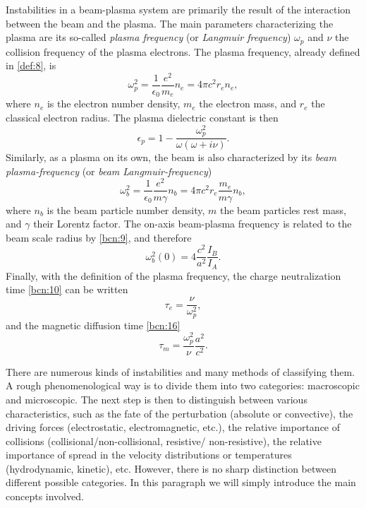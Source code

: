 \documentclass [12pt,a4paper,     ]{report} %
\begin{document}
	Instabilities in a beam-plasma system are primarily the result of the interaction between the beam and the plasma.  The main parameters characterizing the plasma are its so-called \emph{plasma frequency} (or \emph{Langmuir frequency})  $\omega_p$  and $\nu$ the collision frequency of the plasma electrons.  The plasma frequency, already defined in \eqref{def:8}, is
%
\begin{equation}\label{sta:5} %
         \omega_p^2 = \frac{1}{\epsilon_0} \frac{e^2}{m_e}  n_e
                    = 4 \pi c^2 r_e n_e,
\end{equation}
%
where $n_e$ is the electron number density, $m_e$ the electron mass, and $r_e$ the classical electron radius.  The plasma dielectric constant is then
%
\begin{equation}\label{sta:6} %
              \epsilon_p = 1 - \frac{\omega_p^2}{\omega(\omega+i\nu)}.
\end{equation}
%
Similarly, as a plasma on its own, the beam is also characterized by its \emph{beam plasma-frequency} (or \emph{beam Langmuir-frequency})
%
\begin{equation}\label{sta:7} %
        \omega_b^2 = \frac{1}{\epsilon_0} \frac{e^2}{m\gamma}  n_b
                   = 4 \pi c^2 r_e \frac{m_e}{m\gamma} n_b,
\end{equation}
%
where $n_b$ is the beam particle number density, $m$ the beam particles rest mass, and $\gamma$ their Lorentz factor.  The on-axis beam-plasma frequency is related to the beam scale radius by \eqref{bcn:9}, and therefore
%
\begin{equation}\label{sta:8} %
       \omega_b^2(0) = 4 \frac{c^2}{a^2} \frac{I_B}{I_A}.
\end{equation}
%
Finally, with the definition of the plasma frequency, the charge neutralization time \eqref{bcn:10} can be written
%
\begin{equation}\label{sta:10} %
    \tau_e =   \frac{\nu}{\omega_p^2},
\end{equation}
%
and the magnetic diffusion time \eqref{bcn:16}
%
\begin{equation}\label{sta:9} %
    \tau_m = \frac{\omega_p^2}{\nu} \frac{a^2}{c^2}.
\end{equation}
%

	There are numerous kinds of instabilities and many methods of classifying them.  A rough phenomenological way is to divide them into two categories: macroscopic and microscopic.  The next step is then to distinguish between various characteristics, such as the fate of the perturbation (absolute or convective), the driving forces (electrostatic, electromagnetic, etc.), the relative importance of collisions (collisional/non-collisional, resistive/ non-resistive), the relative importance of spread in the velocity distributions or temperatures (hydrodynamic, kinetic), etc.  However, there is no sharp distinction between different possible categories.  In this paragraph we will simply introduce the main concepts involved.
\end{document}
